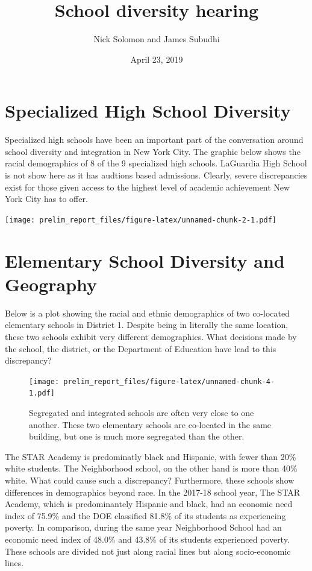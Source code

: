 \documentclass[11pt,]{article}
\title{School diversity hearing}
\author{Nick Solomon and James Subudhi}
\date{April 23, 2019}
\begin{document}
\maketitle
\thispagestyle{fancy}

\hypertarget{specialized-high-school-diversity}{%
\section{Specialized High School Diversity}\label{specialized-high-school-diversity}}

Specialized high schools have been an important part of the conversation around school diversity and integration in New York City. The graphic below shows the racial demographics of 8 of the 9 specialized high schools. LaGuardia High School is not show here as it has audtions based admissions. Clearly, severe discrepancies exist for those given access to the highest level of academic achievement New York City has to offer.

\texttt{[image: prelim\_report\_files/figure-latex/unnamed-chunk-2-1.pdf]}

\hypertarget{elementary-school-diversity-and-geography}{%
\section{Elementary School Diversity and Geography}\label{elementary-school-diversity-and-geography}}

Below is a plot showing the racial and ethnic demographics of two co-located elementary schools in District 1. Despite being in literally the same location, these two schools exhibit very different demographics. What decisions made by the school, the district, or the Department of Education have lead to this discrepancy?
\begin{figure}
\centering
\texttt{[image: prelim\_report\_files/figure-latex/unnamed-chunk-4-1.pdf]}
\caption{\label{fig:unnamed-chunk-4}Segregated and integrated schools are often very close to one another. These two elementary schools are co-located in the same building, but one is much more segregated than the other.}
\end{figure}
The STAR Academy is predominatly black and Hispanic, with fewer than 20\% white students. The Neighborhood school, on the other hand is more than 40\% white. What could cause such a discrepancy? Furthermore, these schools show differences in demographics beyond race. In the 2017-18 school year, The STAR Academy, which is predominantely Hispanic and black, had an economic need index of 75.9\% and the DOE classified 81.8\% of its students as experiencing poverty. In comparison, during the same year Neighborhood School had an economic need index of 48.0\% and 43.8\% of its students experienced poverty. These schools are divided not just along racial lines but along socio-economic lines.
\end{document}
